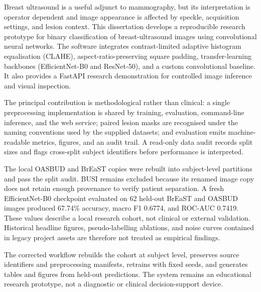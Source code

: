 Breast ultrasound is a useful adjunct to mammography, but its interpretation is operator dependent and image appearance is affected by speckle, acquisition settings, and lesion context. This dissertation develops a reproducible research prototype for binary classification of breast-ultrasound images using convolutional neural networks. The software integrates contrast-limited adaptive histogram equalisation (CLAHE), aspect-ratio-preserving square padding, transfer-learning backbones (EfficientNet-B0 and ResNet-50), and a custom convolutional baseline. It also provides a FastAPI research demonstration for controlled image inference and visual inspection.

The principal contribution is methodological rather than clinical: a single preprocessing implementation is shared by training, evaluation, command-line inference, and the web service; paired lesion masks are recognised under the naming conventions used by the supplied datasets; and evaluation emits machine-readable metrics, figures, and an audit trail. A read-only data audit records split sizes and flags cross-split subject identifiers before performance is interpreted.

The local OASBUD and BrEaST copies were rebuilt into subject-level partitions and pass the split audit. BUSI remains excluded because its renamed image copy does not retain enough provenance to verify patient separation. A fresh EfficientNet-B0 checkpoint evaluated on 62 held-out BrEaST and OASBUD images produced 67.74\% accuracy, macro F1 0.6774, and ROC-AUC 0.7419. These values describe a local research cohort, not clinical or external validation. Historical headline figures, pseudo-labelling ablations, and noise curves contained in legacy project assets are therefore not treated as empirical findings.

The corrected workflow rebuilds the cohort at subject level, preserves source identifiers and preprocessing manifests, retrains with fixed seeds, and generates tables and figures from held-out predictions. The system remains an educational research prototype, not a diagnostic or clinical decision-support device.
